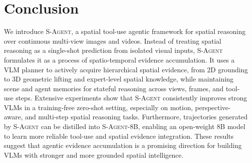 \section{Conclusion}
\label{sec:conclusion}

We introduce \textsc{S-Agent}, a spatial tool-use agentic framework for spatial reasoning over continuous multi-view images and videos. 
Instead of treating spatial reasoning as a single-shot prediction from isolated visual inputs, \textsc{S-Agent} formulates it as a process of spatio-temporal evidence accumulation. 
It uses a VLM planner to actively acquire hierarchical spatial evidence, from 2D grounding to 3D geometric lifting and expert-level spatial knowledge, while maintaining scene and agent memories for stateful reasoning across views, frames, and tool-use steps. 
Extensive experiments show that \textsc{S-Agent} consistently improves strong VLMs in a training-free zero-shot setting, especially on motion, perspective-aware, and multi-step spatial reasoning tasks. 
Furthermore, trajectories generated by \textsc{S-Agent} can be distilled into \textsc{S-Agent-8B}, enabling an open-weight 8B model to learn more reliable tool-use and spatial evidence integration. 
These results suggest that agentic evidence accumulation is a promising direction for building VLMs with stronger and more grounded spatial intelligence.
